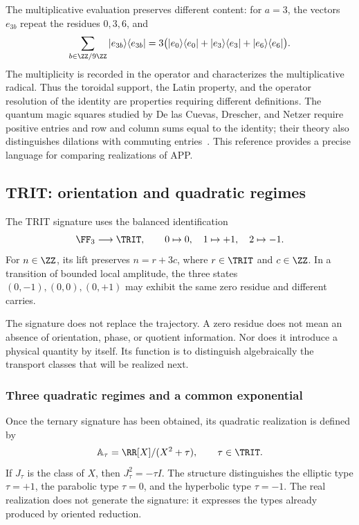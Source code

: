 The multiplicative evaluation preserves different content: for \(a=3\), the
vectors \(e_{3b}\) repeat the residues \(0,3,6\), and
\[
 \sum_{b\in\ZZ/9\ZZ}|e_{3b}\rangle\langle e_{3b}|
 =3\bigl(|e_0\rangle\langle e_0|+|e_3\rangle\langle e_3|
                    +|e_6\rangle\langle e_6|\bigr).
\]
The multiplicity is recorded in the operator and characterizes the multiplicative
radical. Thus the toroidal support, the Latin property, and the operator
resolution of the identity are properties requiring different definitions.
The quantum magic squares studied by De las Cuevas, Drescher, and Netzer
require positive entries and row and column sums equal to the identity;
their theory also distinguishes dilations with commuting entries~\cite{delascuevas2020}.
This reference provides a precise language for comparing realizations of APP.

\subsection{TRIT: orientation and quadratic regimes}

\begin{definition}
The TRIT signature uses the balanced identification
\[
 \FF_3\longrightarrow\TRIT,\qquad 0\mapsto0,\quad1\mapsto+1,\quad2\mapsto-1.
\]
For \(n\in\ZZ\), its lift preserves \(n=r+3c\), where \(r\in\TRIT\) and \(c\in\ZZ\). In a transition of bounded local amplitude, the three states \((0,-1),(0,0),(0,+1)\) may exhibit the same zero residue and different carries.
\end{definition}

The signature does not replace the trajectory. A zero residue does not mean an absence of orientation, phase, or quotient information. Nor does it introduce a physical quantity by itself. Its function is to distinguish algebraically the transport classes that will be realized next.

\subsubsection{Three quadratic regimes and a common exponential}

Once the ternary signature has been obtained, its quadratic realization is defined by
\begin{equation}
 \mathbb A_\tau=\RR[X]/(X^2+\tau),\qquad \tau\in\TRIT.
 \label{eq:algebras-trit}
\end{equation}
If \(J_\tau\) is the class of \(X\), then \(J_\tau^2=-\tau I\). The structure distinguishes the elliptic type \(\tau=+1\), the parabolic type \(\tau=0\), and the hyperbolic type \(\tau=-1\). The real realization does not generate the signature: it expresses the types already produced by oriented reduction.

